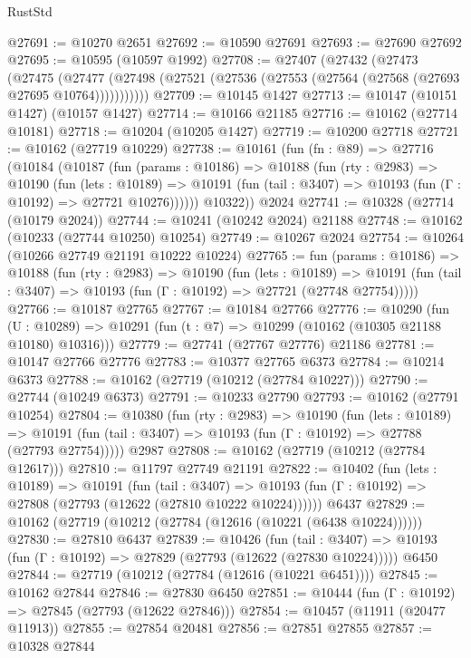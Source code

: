 \begin{lexlean}{RustStd}
\begin{coremodule}
@27691 := @10270 @2651
@27692 := @10590 @27691
@27693 := @27690 @27692
@27695 := @10595 (@10597 @1992)
@27708 := @27407
    (@27432
      (@27473
        (@27475
          (@27477 (@27498 (@27521 (@27536 (@27553 (@27564 (@27568 (@27693 @27695 @10764)))))))))))
@27709 := @10145 @1427
@27713 := @10147 (@10151 @1427) (@10157 @1427)
@27714 := @10166 @21185
@27716 := @10162 (@27714 @10181)
@27718 := @10204 (@10205 @1427)
@27719 := @10200 @27718
@27721 := @10162 (@27719 @10229)
@27738 := @10161
    (fun (fn : @89) =>
    @27716
      (@10184
        (@10187
          (fun (params : @10186) =>
          @10188
            (fun (rty : @2983) =>
            @10190
              (fun (lets : @10189) =>
              @10191 (fun (tail : @3407) => @10193 (fun (Γ : @10192) => @27721 @10276))))))
        @10322))
    @2024
@27741 := @10328 (@27714 (@10179 @2024))
@27744 := @10241 (@10242 @2024) @21188
@27748 := @10162 (@10233 (@27744 @10250) @10254)
@27749 := @10267 @2024
@27754 := @10264 (@10266 @27749 @21191 @10222 @10224)
@27765 := fun (params : @10186) =>
  @10188
    (fun (rty : @2983) =>
    @10190
      (fun (lets : @10189) =>
      @10191 (fun (tail : @3407) => @10193 (fun (Γ : @10192) => @27721 (@27748 @27754)))))
@27766 := @10187 @27765
@27767 := @10184 @27766
@27776 := @10290
    (fun (U : @10289) => @10291 (fun (t : @7) => @10299 (@10162 (@10305 @21188 @10180) @10316)))
@27779 := @27741 (@27767 @27776) @21186
@27781 := @10147 @27766 @27776
@27783 := @10377 @27765 @6373
@27784 := @10214 @6373
@27788 := @10162 (@27719 (@10212 (@27784 @10227)))
@27790 := @27744 (@10249 @6373)
@27791 := @10233 @27790
@27793 := @10162 (@27791 @10254)
@27804 := @10380
    (fun (rty : @2983) =>
    @10190
      (fun (lets : @10189) =>
      @10191 (fun (tail : @3407) => @10193 (fun (Γ : @10192) => @27788 (@27793 @27754)))))
    @2987
@27808 := @10162 (@27719 (@10212 (@27784 @12617)))
@27810 := @11797 @27749 @21191
@27822 := @10402
    (fun (lets : @10189) =>
    @10191
      (fun (tail : @3407) =>
      @10193 (fun (Γ : @10192) => @27808 (@27793 (@12622 (@27810 @10222 @10224))))))
    @6437
@27829 := @10162 (@27719 (@10212 (@27784 (@12616 (@10221 (@6438 @10224))))))
@27830 := @27810 @6437
@27839 := @10426
    (fun (tail : @3407) => @10193 (fun (Γ : @10192) => @27829 (@27793 (@12622 (@27830 @10224)))))
    @6450
@27844 := @27719 (@10212 (@27784 (@12616 (@10221 @6451))))
@27845 := @10162 @27844
@27846 := @27830 @6450
@27851 := @10444 (fun (Γ : @10192) => @27845 (@27793 (@12622 @27846)))
@27854 := @10457 (@11911 (@20477 @11913))
@27855 := @27854 @20481
@27856 := @27851 @27855
@27857 := @10328 @27844

\end{coremodule}
\end{lexlean}
